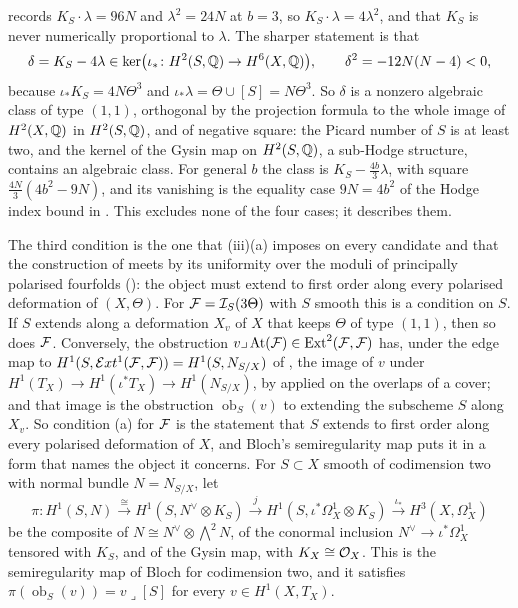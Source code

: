 \begin{remark}\label{rem:gysinkernel}
 records $K_{S}\cdot\lambda=96N$ and
$\lambda^{2}=24N$ at $b=3$, so $K_{S}\cdot\lambda=4\lambda^{2}$, and that
$K_{S}$ is never numerically proportional to $\lambda$. The sharper
statement is that
\[
  \delta=K_{S}-4\lambda\in\ker\bigl(\iota_{*}\colon H^{2}(S,\mathbb{Q})\to H^{6}(X,\mathbb{Q})\bigr),
  \qquad \delta^{2}=-12N(N-4)<0,
\]
because $\iota_{*}K_{S}=4N\Theta^{3}$ and
$\iota_{*}\lambda=\Theta\cup[S]=N\Theta^{3}$. So $\delta$ is a nonzero
algebraic class of type $(1,1)$, orthogonal by the projection formula to the
whole image of $H^{2}(X,\mathbb{Q})$ in $H^{2}(S,\mathbb{Q})$, and of negative square: the
Picard number of $S$ is at least two, and the kernel of the Gysin map on
$H^{2}(S,\mathbb{Q})$, a sub-Hodge structure, contains an algebraic class. For
general $b$ the class is $K_{S}-\tfrac{4b}{3}\lambda$, with square
$\tfrac{4N}{3}(4b^{2}-9N)$, and its vanishing is the equality case $9N=4b^{2}$
of the Hodge index bound in . This excludes none
of the four cases; it describes them.
\end{remark}

The third condition is the one that (iii)(a) imposes on
every candidate and that the construction of  meets by
its uniformity over the moduli of principally polarised fourfolds
(): the object must extend to first order along
every polarised deformation of $(X,\Theta)$. For $\mathcal{F}=\mathcal{I}_{S}(3\Theta)$ with
$S$ smooth this is a condition on $S$. If $S$ extends along a deformation
$X_{v}$ of $X$ that keeps $\Theta$ of type $(1,1)$, then so does $\mathcal{F}$.
Conversely, the obstruction $v\lrcorner\,\mathrm{At}(\mathcal{F})\in\operatorname{Ext}^{2}(\mathcal{F},\mathcal{F})$
has, under the edge map to $H^{1}(S,\mathcal{E} xt^{1}(\mathcal{F},\mathcal{F}))=H^{1}(S,N_{S/X})$ of
, the image of $v$ under
$H^{1}(T_{X})\to H^{1}(\iota^{*}T_{X})\to H^{1}(N_{S/X})$, by
 applied on the overlaps of a cover; and that image is the
obstruction $\operatorname{ob}_{S}(v)$ to extending the subscheme $S$ along
$X_{v}$. So condition (a) for $\mathcal{F}$ is the statement that $S$ extends to
first order along every polarised deformation of $X$, and Bloch's
semiregularity map \cite{Blo72} puts it in a form that names the object it
concerns. For $S\subset X$ smooth of codimension two with normal bundle
$N=N_{S/X}$, let
\[
  \pi\colon H^{1}(S,N)\xrightarrow{\ \cong\ }H^{1}(S,N^{\vee}\otimes K_{S})
  \xrightarrow{\ j\ }H^{1}(S,\iota^{*}\Omega^{1}_{X}\otimes K_{S})
  \xrightarrow{\ \iota_{*}\ }H^{3}(X,\Omega^{1}_{X})
\]
be the composite of $N\cong N^{\vee}\otimes\bigwedge^{2}N$, of the conormal
inclusion $N^{\vee}\to\iota^{*}\Omega^{1}_{X}$ tensored with $K_{S}$, and of
the Gysin map, with $K_{X}\cong\mathcal{O}_{X}$. This is the semiregularity map of
Bloch for codimension two, and it satisfies
$\pi(\operatorname{ob}_{S}(v))=v\lrcorner[S]$ for every $v\in H^{1}(X,T_{X})$.

